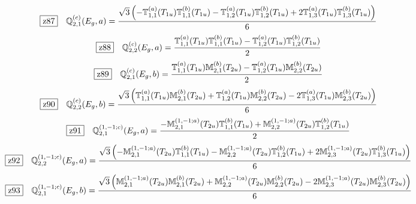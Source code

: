 \documentclass[fleqn,10pt,landscape]{jsarticle}
\begin{document}
\begin{dmath*}
\hspace*{3mm}\fbox{z87}\quad \mathbb{Q}_{2,1}^{(c)}(E_{g},a)=\frac{\sqrt{3} \left(- \mathbb{T}_{1,1}^{(a)}(T_{1u}) \mathbb{T}_{1,1}^{(b)}(T_{1u}) - \mathbb{T}_{1,2}^{(a)}(T_{1u}) \mathbb{T}_{1,2}^{(b)}(T_{1u}) + 2 \mathbb{T}_{1,3}^{(a)}(T_{1u}) \mathbb{T}_{1,3}^{(b)}(T_{1u})\right)}{6}
\end{dmath*}
\begin{dmath*}
\hspace*{3mm}\fbox{z88}\quad \mathbb{Q}_{2,2}^{(c)}(E_{g},a)=\frac{\mathbb{T}_{1,1}^{(a)}(T_{1u}) \mathbb{T}_{1,1}^{(b)}(T_{1u}) - \mathbb{T}_{1,2}^{(a)}(T_{1u}) \mathbb{T}_{1,2}^{(b)}(T_{1u})}{2}
\end{dmath*}
\begin{dmath*}
\hspace*{3mm}\fbox{z89}\quad \mathbb{Q}_{2,1}^{(c)}(E_{g},b)=\frac{\mathbb{T}_{1,1}^{(a)}(T_{1u}) \mathbb{M}_{2,1}^{(b)}(T_{2u}) - \mathbb{T}_{1,2}^{(a)}(T_{1u}) \mathbb{M}_{2,2}^{(b)}(T_{2u})}{2}
\end{dmath*}
\begin{dmath*}
\hspace*{3mm}\fbox{z90}\quad \mathbb{Q}_{2,2}^{(c)}(E_{g},b)=\frac{\sqrt{3} \left(\mathbb{T}_{1,1}^{(a)}(T_{1u}) \mathbb{M}_{2,1}^{(b)}(T_{2u}) + \mathbb{T}_{1,2}^{(a)}(T_{1u}) \mathbb{M}_{2,2}^{(b)}(T_{2u}) - 2 \mathbb{T}_{1,3}^{(a)}(T_{1u}) \mathbb{M}_{2,3}^{(b)}(T_{2u})\right)}{6}
\end{dmath*}
\begin{dmath*}
\hspace*{3mm}\fbox{z91}\quad \mathbb{Q}_{2,1}^{(1,-1;c)}(E_{g},a)=\frac{- \mathbb{M}_{2,1}^{(1,-1;a)}(T_{2u}) \mathbb{T}_{1,1}^{(b)}(T_{1u}) + \mathbb{M}_{2,2}^{(1,-1;a)}(T_{2u}) \mathbb{T}_{1,2}^{(b)}(T_{1u})}{2}
\end{dmath*}
\begin{dmath*}
\hspace*{3mm}\fbox{z92}\quad \mathbb{Q}_{2,2}^{(1,-1;c)}(E_{g},a)=\frac{\sqrt{3} \left(- \mathbb{M}_{2,1}^{(1,-1;a)}(T_{2u}) \mathbb{T}_{1,1}^{(b)}(T_{1u}) - \mathbb{M}_{2,2}^{(1,-1;a)}(T_{2u}) \mathbb{T}_{1,2}^{(b)}(T_{1u}) + 2 \mathbb{M}_{2,3}^{(1,-1;a)}(T_{2u}) \mathbb{T}_{1,3}^{(b)}(T_{1u})\right)}{6}
\end{dmath*}
\begin{dmath*}
\hspace*{3mm}\fbox{z93}\quad \mathbb{Q}_{2,1}^{(1,-1;c)}(E_{g},b)=\frac{\sqrt{3} \left(\mathbb{M}_{2,1}^{(1,-1;a)}(T_{2u}) \mathbb{M}_{2,1}^{(b)}(T_{2u}) + \mathbb{M}_{2,2}^{(1,-1;a)}(T_{2u}) \mathbb{M}_{2,2}^{(b)}(T_{2u}) - 2 \mathbb{M}_{2,3}^{(1,-1;a)}(T_{2u}) \mathbb{M}_{2,3}^{(b)}(T_{2u})\right)}{6}
\end{dmath*}
\end{document}
